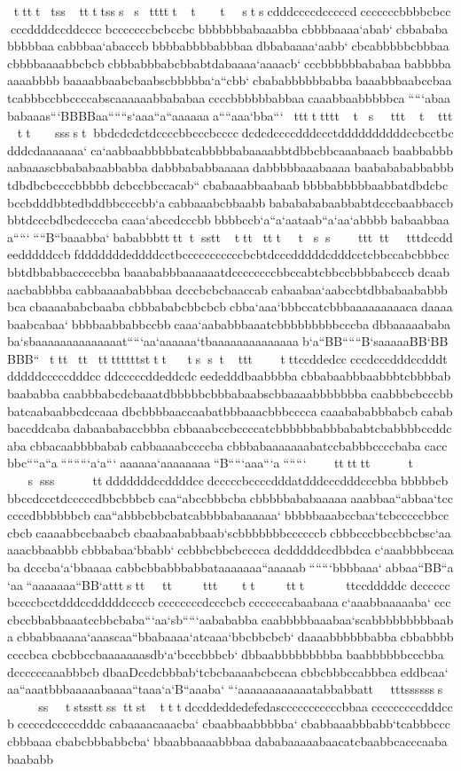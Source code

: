 tttttssttttsssstttttttstscdddccccdcccccdcccccccbbbbcbcccccddddccddccccbcccccccbcbccbcbbbbbbbabaaabbacbbbbaaaa`abab`cbbabababbbbbaacabbbaa`abacccbbbbbabbbbabbbaadbbabaaaa`aabb`cbcabbbbbcbbbaacbbbbaaaabbcbcbcbbbabbbabcbbabtdabaaaa`aaaacb`cccbbbbbbababaababbbbaaaaabbbbbaaaabbaabcbaabscbbbbba`a``cbb`cbababbbbbbabbabaaabbbaabccbaatcabbbccbbccccabscaaaaaabbababaaccccbbbbbbabbaacaaabbaabbbbbca`````abaababaaas```BBBBaa``````s`aaa``a``aaaaaaa````aaa`bba```tttttttttstttttttttsssstbbdcdcdctdccccbbcccbccccdcdcdccccdddccctddddddddddccbcctbcdddcdaaaaaaa`ca`aabbaabbbbbatcabbbbbabaaaabbtdbbcbbcaaabaacbbaabbabbbaabaaascbbababaabbabbadabbbababbaaaaadabbbbbaaabaaaabaababababbabbbtdbdbcbccccbbbbbdcbccbbccacab``cbabaaabbaabaabbbbbabbbbbaabbatdbdcbcbccbdddbbtedbddbbccccbb`acabbaaabcbbaabbbababababaabbabtdcccbaabbaccbbbtdcccbdbcdccccbacaaa`abccdcccbbbbbbccb`a``a`aataab``a`aa`abbbbbabaabbaaa`````````B``baaabba`bababbbtttttsstttttttttssttttttttdccddeedddddccbfdddddddeddddcctbcccccccccccbcbtdcccdddddcdddcctcbbccabcbbbccbbtdbbabbacccccbbabaaababbbaaaaaatdccccccccbbccabtcbbccbbbbabcccbdcaabaacbabbbbacabbaaaababbbaadcccbcbcbaaccabcabaabaa`aabccbtdbbabaababbbbcacbaaaababcbaabacbbbababcbbcbcbcbba`aaa`bbbccatcbbbaaaaaaaaacadaaaabaabcabaa`bbbbaabbabbccbbcaaa`aababbbaaatcbbbbbbbbbcccbadbbaaaaabababa`sbaaaaaaaaaaaaaat`````aa`aaaaaa`tbaaaaaaaaaaaaaab`a``BB``````B`saaaaaBB`BBBBB``tttttttttttttsttttsstttttttccddedcccccdcccdddccdddtdddddcccccdddccddcccccddeddcdceededddbaabbbbacbbabaabbbaabbbtcbbbbabbaababbacaabbbabcdcbaaatdbbbbbcbbbabaabscbbaaaabbbbbbbacaabbbcbcccbbbatcaabaabbcdccaaadbcbbbbaaccaabatbbbaaacbbbccccacaaabababbbabcbcababbaccddcabadabaababaccbbbacbbaaabccbccccatcbbbbbbabbbababtcbabbbbccddcabacbbacaabbbbababcabbaaaabccccbacbbbabaaaaaaabatccbabbbccccbabacaccbbc````a``a`````````a`a```aaaaaa`aaaaaaaa``B`````aaa```a```````tttttttssssttdddddddccddddccdcccccbccccdddatdddcccdddcccbbabbbbbcbbbccdccctdcccccdbbcbbbcbcaa``abccbbbcbacbbbbbababaaaaaaaabbaa``abbaa`tccccccdbbbbbbcbcaa``abbbcbbcbatcabbbbabaaaaaa`bbbbbaaabccbaa`tcbcccccbbcccbcbcaaaabbccbaabcbcbaabaababbaab`scbbbbbbbccccccbcbbbcccbbccbbcbsc`aaaaacbbaabbbcbbbabaa`bbabb`ccbbbcbbcbccccadcdddddccdbbdcac`aaabbbbccaabadcccba`a`bbaaaacabbcbbabbbabbataaaaaaa``aaaaab```````bbbbaaa`abbaa``BB``a`aa``aaaaaaa``BB`atttsttttttttttttttccdddddcdccccccbccccbcctdddccdddddccccbccccccccdcccbcbcccccccabaabaaac`aaabbaaaaaba`ccccbccbbabbaaatccbbcbaba```aa`sb`````aabababbacaabbbbbaaabaa`scabbbbbbbbbaabacbbabbaaaaa`aaascaa``bbabaaaa`atcaaa`bbcbbcbcb`daaaabbbbbbabbacbbabbbbccccbcacbcbbccbaaaaaaasdb`a`bcccbbbcb`dbbaabbbbbbbbbabaabbbbbbcccbbadccccccaaabbbcbdbaaDccdcbbbab`tcbcbaaaabcbccaacbbcbbbccabbbcaeddbcaa`aa``aaatbbbaaaaabaaaa``taaa`a`B``aaaba````aaaaaaaaaaaatabbabbatttttssssssssststssttssttsttttdccddeddedefedascccccccccccbbaacccccccccdddccbcccccdcccccdddccabaaaacaaacba`cbaabbaabbbbba`cbabbaaabbbabb`tcabbbccccbbbaaacbabcbbbabbcba`bbaabbaaaabbbaadababaaaaabaacatcbaabbcacccaababaababb
